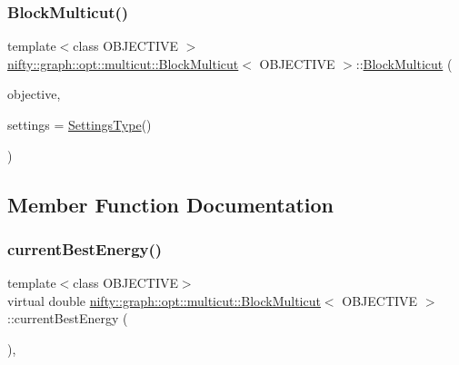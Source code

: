 \subsubsection{\texorpdfstring{Block\+Multicut()}{BlockMulticut()}}
{\footnotesize\ttfamily template$<$class O\+B\+J\+E\+C\+T\+I\+VE $>$ \\
\hyperlink{classnifty_1_1graph_1_1opt_1_1multicut_1_1BlockMulticut}{nifty\+::graph\+::opt\+::multicut\+::\+Block\+Multicut}$<$ O\+B\+J\+E\+C\+T\+I\+VE $>$\+::\hyperlink{classnifty_1_1graph_1_1opt_1_1multicut_1_1BlockMulticut}{Block\+Multicut} (\begin{DoxyParamCaption}\item[{const \hyperlink{classnifty_1_1graph_1_1opt_1_1multicut_1_1BlockMulticut_a3a9ea9285ed606615a72dead69babd0a}{Objective\+Type} \&}]{objective,  }\item[{const \hyperlink{structnifty_1_1graph_1_1opt_1_1multicut_1_1BlockMulticut_1_1SettingsType}{Settings\+Type} \&}]{settings = {\ttfamily \hyperlink{structnifty_1_1graph_1_1opt_1_1multicut_1_1BlockMulticut_1_1SettingsType}{Settings\+Type}()} }\end{DoxyParamCaption})}



\subsection{Member Function Documentation}
\mbox{\label{classnifty_1_1graph_1_1opt_1_1multicut_1_1BlockMulticut_ae1dcff4732ce6e535f07916fc57565b2}} 
\subsubsection{\texorpdfstring{current\+Best\+Energy()}{currentBestEnergy()}}
{\footnotesize\ttfamily template$<$class O\+B\+J\+E\+C\+T\+I\+VE$>$ \\
virtual double \hyperlink{classnifty_1_1graph_1_1opt_1_1multicut_1_1BlockMulticut}{nifty\+::graph\+::opt\+::multicut\+::\+Block\+Multicut}$<$ O\+B\+J\+E\+C\+T\+I\+VE $>$\+::current\+Best\+Energy (\begin{DoxyParamCaption}{ }\end{DoxyParamCaption})\hspace{0.3cm}{\ttfamily [inline]}, {\ttfamily [virtual]}}



